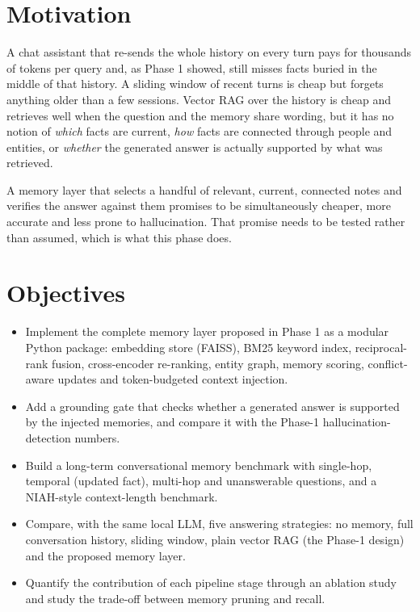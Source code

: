 \section{Motivation}
A chat assistant that re-sends the whole history on every turn pays for thousands of tokens per query and,
as Phase 1 showed, still misses facts buried in the middle of that history. A sliding window of recent turns
is cheap but forgets anything older than a few sessions. Vector RAG over the history is cheap and retrieves
well when the question and the memory share wording, but it has no notion of \emph{which} facts are current,
\emph{how} facts are connected through people and entities, or \emph{whether} the generated answer is
actually supported by what was retrieved.

A memory layer that selects a handful of relevant, current, connected notes and verifies the answer against
them promises to be simultaneously cheaper, more accurate and less prone to hallucination. That promise
needs to be tested rather than assumed, which is what this phase does.

\section{Objectives}
\begin{itemize}[nosep]
  \item Implement the complete memory layer proposed in Phase 1 as a modular Python package: embedding
        store (FAISS), BM25 keyword index, reciprocal-rank fusion, cross-encoder re-ranking, entity graph,
        memory scoring, conflict-aware updates and token-budgeted context injection.
  \item Add a grounding gate that checks whether a generated answer is supported by the injected memories,
        and compare it with the Phase-1 hallucination-detection numbers.
  \item Build a long-term conversational memory benchmark with single-hop, temporal (updated fact),
        multi-hop and unanswerable questions, and a NIAH-style context-length benchmark.
  \item Compare, with the same local LLM, five answering strategies: no memory, full conversation history,
        sliding window, plain vector RAG (the Phase-1 design) and the proposed memory layer.
  \item Quantify the contribution of each pipeline stage through an ablation study and study the trade-off
        between memory pruning and recall.
\end{itemize}

